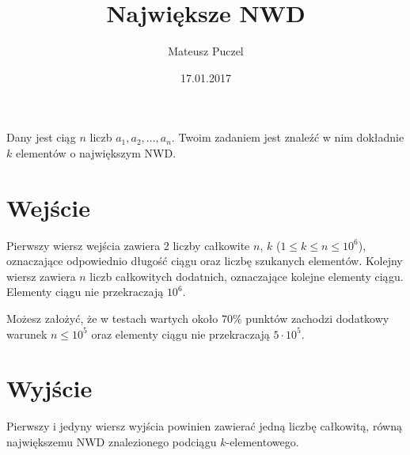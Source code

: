 \documentclass[zad,zawodnik]{sinol}
\title{Największe NWD}
\author{Mateusz Puczel} %
\date{17.01.2017}
\begin{document}
  \begin{tasktext}%
Dany jest ciąg $n$ liczb ${a_1}, {a_2}, ..., {a_n}$. Twoim zadaniem jest znaleźć w nim dokładnie $k$ elementów o największym NWD.
  \section{Wejście}
Pierwszy wiersz wejścia zawiera 2 liczby całkowite $n$, $k$ ($1 \leq k \leq n \leq 10^6$), 
oznaczające odpowiednio długość ciągu oraz liczbę szukanych elementów.
Kolejny wiersz zawiera $n$ liczb całkowitych dodatnich, oznaczające kolejne elementy ciągu. Elementy ciągu nie przekraczają $10^6$.

Możesz założyć, że w testach wartych około $70\%$ punktów zachodzi dodatkowy warunek $n \leq 10^5$ oraz elementy ciągu nie przekraczają $5\cdot10^5$.
  \section{Wyjście}
Pierwszy i jedyny wiersz wyjścia powinien zawierać jedną liczbę całkowitą, 
równą największemu NWD znalezionego podciągu $k$-elementowego.

     \makecompactexample    

  \end{tasktext}
\end{document}
